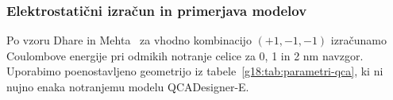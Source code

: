 \documentclass[12pt,a4paper]{article}
\begin{document}
\subsubsection{Elektrostatični izračun in primerjava modelov}
\label{g18:sec:primerjava-modelov}

Po vzoru Dhare in Mehta~\cite{g18:dhare2023} za vhodno kombinacijo $(+1,-1,-1)$ izračunamo Coulombove energije pri odmikih notranje celice za 0, 1 in 2 nm navzgor. Uporabimo poenostavljeno geometrijo iz tabele~\ref{g18:tab:parametri-qca}, ki ni nujno enaka notranjemu modelu QCADesigner-E.

\begin{table}[H]
    \centering
    \begin{minipage}[t]{0.55\linewidth}
        \centering
        \label{g18:tab:parametri-qca}
        \vspace{2pt}
    \end{minipage}\hfill
    \begin{minipage}[t]{0.42\linewidth}
        \centering
        \label{g18:tab:izbrani-odmiki}
        \vspace{2pt}
    \end{minipage}
\end{table}
\end{document}
